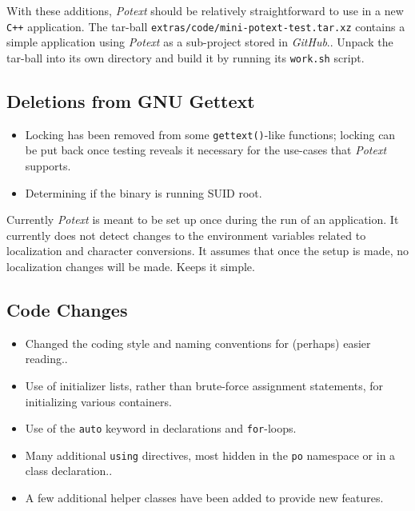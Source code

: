 \documentclass[
 11pt,
 twoside,
 a4paper,
 final                                 %
]{article}
\begin{document}
   With these additions, \textsl{Potext} should be relatively straightforward
   to use in a new \texttt{C++} application.
   The tar-ball
   \texttt{extras/code/mini-potext-test.tar.xz}
   contains a simple application using \textsl{Potext} as a sub-project
   stored in \textsl{GitHub}..
   Unpack the tar-ball into its own directory
   and build it by running its
   \texttt{work.sh} script.

\subsection{Deletions from GNU Gettext}
\label{subsec:introduction_deletions}

   \begin{itemize}
      \item Locking has been removed from some \texttt{gettext()}-like
         functions; locking can be put back once testing reveals
        it necessary for the use-cases that \textsl{Potext} supports.
      \item Determining if the binary is running SUID root.
   \end{itemize}

   Currently \textsl{Potext} is meant to be set up once during
   the run of an application.
   It currently does not detect changes to the environment variables
   related to localization and character conversions.
   It assumes that once the setup is made, no localization changes
   will be made. Keeps it simple.

\subsection{Code Changes}
\label{subsec:introduction_changes}

   \begin{itemize}
      \item Changed the coding style and naming conventions for
         (perhaps) easier reading..
      \item Use of initializer lists, rather than brute-force
         assignment statements, for initializing various containers.
      \item Use of the \texttt{auto} keyword in declarations and
         \texttt{for}-loops.
      \item Many additional \texttt{using} directives, most hidden
         in the \texttt{po} namespace or in a class declaration..
      \item A few additional helper classes have been added to provide
         new features.
   \end{itemize}
\end{document}
